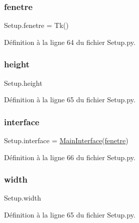 \mbox{\label{namespaceSetup_af395de35aeb7bf3d25e14620ec4bdc7e}} 
\subsubsection{\texorpdfstring{fenetre}{fenetre}}
{\footnotesize\ttfamily Setup.\+fenetre = Tk()}



Définition à la ligne 64 du fichier Setup.\+py.

\mbox{\label{namespaceSetup_ae61abac3c4d5091fef21491962b7450f}} 
\subsubsection{\texorpdfstring{height}{height}}
{\footnotesize\ttfamily Setup.\+height}



Définition à la ligne 65 du fichier Setup.\+py.

\mbox{\label{namespaceSetup_a1f55b250260065e5026241cc21093628}} 
\subsubsection{\texorpdfstring{interface}{interface}}
{\footnotesize\ttfamily Setup.\+interface = \hyperlink{classSetup_1_1MainInterface}{Main\+Interface}(\hyperlink{namespaceSetup_af395de35aeb7bf3d25e14620ec4bdc7e}{fenetre})}



Définition à la ligne 66 du fichier Setup.\+py.

\mbox{\label{namespaceSetup_a399c4d17343f2647bc242ffe5f774c58}} 
\subsubsection{\texorpdfstring{width}{width}}
{\footnotesize\ttfamily Setup.\+width}



Définition à la ligne 65 du fichier Setup.\+py.


